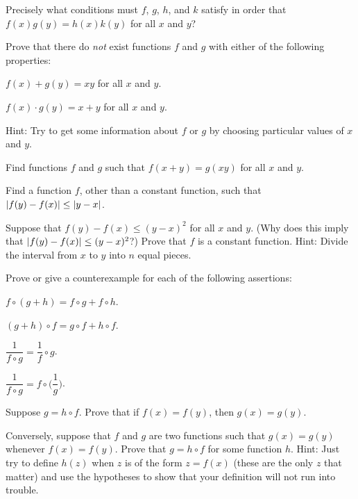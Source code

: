  Precisely what conditions must $f$, $g$, $h$, and $k$ satisfy in
order that $f(x)g(y)=h(x)k(y)$ for all $x$ and $y$?

\begin{letters}
\item Prove that there do \emph{not} exist functions $f$ and $g$ with either
of the following properties:
\begin{romans}
\item $f(x)+g(y)=xy$ for all $x$ and $y$.
\item $f(x) \cdot g(y)=x+y$ for all $x$ and $y$.
\end{romans}
Hint: Try to get some information about $f$ or $g$ by choosing particular
values of $x$ and $y$.
\item Find functions $f$ and $g$ such that $f(x+y)=g(xy)$ for all $x$ and $y$.
\end{letters}

\begin{letters}
\item Find a function $f$, other than a constant function, such that
$\lvert f(y)-f(x)\rvert \leq \lvert y-x\rvert$.
\item Suppose that $f(y)-f(x) \leq (y-x)^2$ for all $x$ and $y$. (Why does this
imply that $\lvert f(y)-f(x)\rvert \leq (y-x)^2$?) Prove that $f$ is a constant
function. Hint: Divide the interval from $x$ to $y$ into $n$ equal pieces.
\end{letters}

 Prove or give a counterexample for each of the following
assertions:
\begin{letters}
\item $f \circ (g+h) = f \circ g + f \circ h$.
\item $(g+h) \circ f = g \circ f + h \circ f$.
\item $\dfrac{1}{f \circ g} = \dfrac{1}{f} \circ g$.
\item $\dfrac{1}{f \circ g} = f \circ \Biggl(\dfrac{1}{g}\Biggr)$.
\end{letters}

\begin{letters}
\item Suppose $g = h \circ f$. Prove that if $f(x)=f(y)$, then $g(x)=g(y)$.
\item Conversely, suppose that $f$ and $g$ are two functions such that
$g(x)=g(y)$ whenever $f(x)=f(y)$. Prove that $g = h \circ f$ for some function
$h$. Hint: Just try to define $h(z)$ when $z$ is of the form $z=f(x)$ (these
are the only $z$ that matter) and use the hypotheses to show that your
definition will not run into trouble.
\end{letters}

